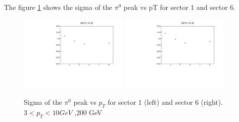 \documentclass{article}
\begin{document}
The figure \ref{sigma200GeV} shows the sigma of the $\pi^{0}$ peak vs pT for sector 1 and sector 6. 
\begin{figure}
\includegraphics[width=0.47\textwidth]{fig_pi0vn/sect1_sigmavspt.pdf}
\includegraphics[width=0.47\textwidth]{fig_pi0vn/sect6_sigmavspt.pdf}
\caption{Sigma of the $\pi^{0}$ peak vs $p_{T}$ for sector 1 (left) and sector 6 (right). $3<p_{T}<10GeV$ ,200 GeV}
\label{sigma200GeV}
\end{figure}
\end{document}
